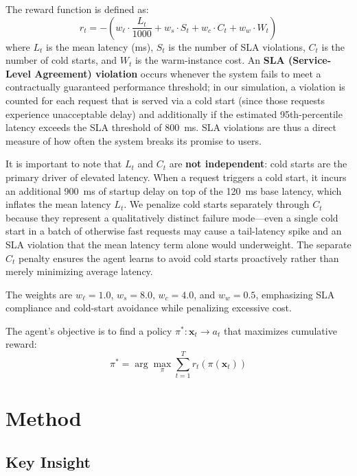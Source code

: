 \documentclass[11pt]{article}
\begin{document}
The reward function is defined as:
\begin{equation}
    r_t = -\left( w_\ell \cdot \frac{L_t}{1000} + w_s \cdot S_t + w_c \cdot C_t + w_w \cdot W_t \right)
\end{equation}
where $L_t$ is the mean latency (ms), $S_t$ is the number of SLA violations, $C_t$ is the number of cold starts, and $W_t$ is the warm-instance cost. An \textbf{SLA (Service-Level Agreement) violation} occurs whenever the system fails to meet a contractually guaranteed performance threshold; in our simulation, a violation is counted for each request that is served via a cold start (since those requests experience unacceptable delay) and additionally if the estimated 95th-percentile latency exceeds the SLA threshold of 800~ms. SLA violations are thus a direct measure of how often the system breaks its promise to users.

It is important to note that $L_t$ and $C_t$ are \textbf{not independent}: cold starts are the primary driver of elevated latency. When a request triggers a cold start, it incurs an additional 900~ms of startup delay on top of the 120~ms base latency, which inflates the mean latency $L_t$. We penalize cold starts separately through $C_t$ because they represent a qualitatively distinct failure mode---even a single cold start in a batch of otherwise fast requests may cause a tail-latency spike and an SLA violation that the mean latency term alone would underweight. The separate $C_t$ penalty ensures the agent learns to avoid cold starts proactively rather than merely minimizing average latency.

The weights are $w_\ell = 1.0$, $w_s = 8.0$, $w_c = 4.0$, and $w_w = 0.5$, emphasizing SLA compliance and cold-start avoidance while penalizing excessive cost.

The agent's objective is to find a policy $\pi^* : \mathbf{x}_t \rightarrow a_t$ that maximizes cumulative reward:
\begin{equation}
    \pi^* = \arg\max_\pi \sum_{t=1}^{T} r_t\!\left(\pi(\mathbf{x}_t)\right)
\end{equation}

\section{Method}

\subsection{Key Insight}
\end{document}
